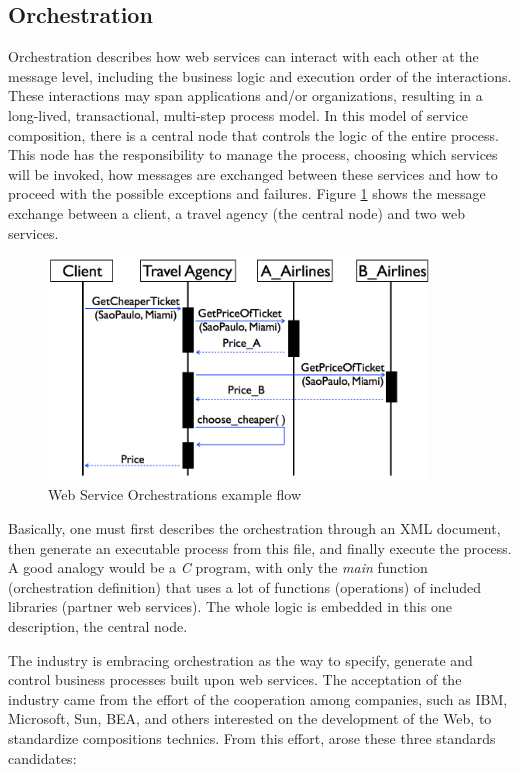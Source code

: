 \subsection{Orchestration}
Orchestration describes how web services can interact with each other at the message level, including the business logic and execution order of the interactions. These interactions may span applications and/or organizations, resulting in a long-lived, transactional, multi-step process model. In this model of service composition, there is a central node that controls the logic of the entire process. This node has the responsibility to manage the process, choosing which services will be invoked, how messages are exchanged between these services and how to proceed with the possible exceptions and failures. Figure \ref{BPELexample} shows the message exchange between a client, a travel agency (the central node) and two web services.

\begin{figure}[htb]
  \centering
  \includegraphics[width=0.9\textwidth]{images/BPELexample}
  \caption{Web Service Orchestrations example flow}
  \label{BPELexample}
\end{figure}

Basically, one must first describes the orchestration through an XML document, then generate an executable process from this file, and finally execute the process. A good analogy would be a \emph{C} program, with only the \emph{main} function (orchestration definition) that uses a lot of functions (operations) of included libraries (partner web services). The whole logic is embedded in this one description, the central node. 

The industry is embracing orchestration as the way to specify, generate and control business processes built upon web services. The acceptation of the industry came from the effort of the cooperation among companies, such as IBM, Microsoft, Sun, BEA, and others interested on the development of the Web, to standardize compositions technics. From this effort, arose these three standards candidates:

